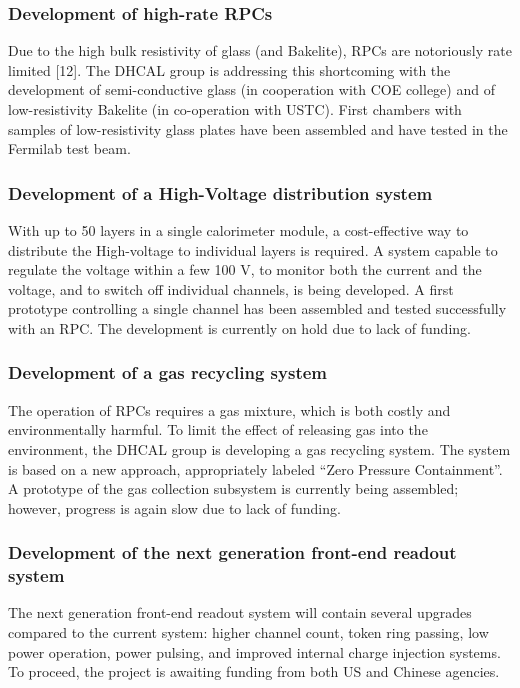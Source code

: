 \subsubsection{Development of high-rate RPCs}
Due to the high bulk resistivity of glass (and Bakelite), RPCs are notoriously rate limited [12]. The DHCAL group is addressing this shortcoming with the development of semi-conductive glass (in cooperation with COE college) and of low-resistivity Bakelite (in co-operation with USTC). First chambers with samples of low-resistivity glass plates have been assembled and have tested in the Fermilab test beam.
\subsubsection{Development of a High-Voltage distribution system}
With up to 50 layers in a single calorimeter module, a cost-effective way to distribute the High-voltage to individual layers is required. A system capable to regulate the voltage within a few 100 V, to monitor both the current and the voltage, and to switch off individual channels, is being developed. A first prototype controlling a single channel has been assembled and tested successfully with an RPC. The development is currently on hold due to lack of funding.
\subsubsection{Development of a gas recycling system}
The operation of RPCs requires a gas mixture, which is both costly and environmentally harmful. To limit the effect of releasing gas into the environment, the DHCAL group is developing a gas recycling system. The system is based on a new approach, appropriately labeled ``Zero Pressure Containment''. A prototype of the gas collection subsystem is currently being assembled; however, progress is again slow due to lack of funding.
\subsubsection{Development of the next generation front-end readout system}
The next generation front-end readout system will contain several upgrades compared to the current system: higher channel count, token ring passing, low power operation, power pulsing, and improved internal charge injection systems. To proceed, the project is awaiting funding from both US and Chinese agencies.

